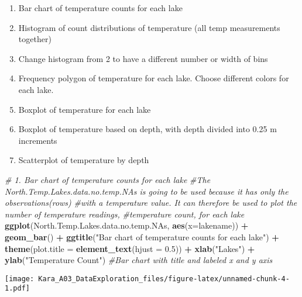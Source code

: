 \documentclass[]{article}
\newenvironment{Shaded}{\begin{snugshade}}{\end{snugshade}}
\newcommand{\KeywordTok}[1]{\textcolor[rgb]{0.13,0.29,0.53}{\textbf{#1}}}
\newcommand{\DataTypeTok}[1]{\textcolor[rgb]{0.13,0.29,0.53}{#1}}
\newcommand{\FloatTok}[1]{\textcolor[rgb]{0.00,0.00,0.81}{#1}}
\newcommand{\StringTok}[1]{\textcolor[rgb]{0.31,0.60,0.02}{#1}}
\newcommand{\CommentTok}[1]{\textcolor[rgb]{0.56,0.35,0.01}{\textit{#1}}}
\newcommand{\OperatorTok}[1]{\textcolor[rgb]{0.81,0.36,0.00}{\textbf{#1}}}
\newcommand{\NormalTok}[1]{#1}
\providecommand{\tightlist}{%
  \setlength{\itemsep}{0pt}\setlength{\parskip}{0pt}}
\begin{document}
\begin{enumerate}
\def\labelenumi{\arabic{enumi}.}
\tightlist
\item
  Bar chart of temperature counts for each lake
\item
  Histogram of count distributions of temperature (all temp measurements
  together)
\item
  Change histogram from 2 to have a different number or width of bins
\item
  Frequency polygon of temperature for each lake. Choose different
  colors for each lake.
\item
  Boxplot of temperature for each lake
\item
  Boxplot of temperature based on depth, with depth divided into 0.25 m
  increments
\item
  Scatterplot of temperature by depth
\end{enumerate}

\begin{Shaded}
\begin{Highlighting}[]
\CommentTok{# 1. Bar chart of temperature counts for each lake}
\CommentTok{#The North.Temp.Lakes.data.no.temp.NAs is going to be used because it has only the observations(rows) }
\CommentTok{#with a temperature value. It can therefore be used to plot the number of temperature readings, }
\CommentTok{#temperature count, for each lake}
\KeywordTok{ggplot}\NormalTok{(North.Temp.Lakes.data.no.temp.NAs, }\KeywordTok{aes}\NormalTok{(}\DataTypeTok{x=}\NormalTok{lakename)) }\OperatorTok{+}\StringTok{ }\KeywordTok{geom_bar}\NormalTok{() }\OperatorTok{+}\StringTok{ }
\StringTok{  }\KeywordTok{ggtitle}\NormalTok{(}\StringTok{"Bar chart of temperature counts for each lake"}\NormalTok{) }\OperatorTok{+}\StringTok{ }
\StringTok{  }\KeywordTok{theme}\NormalTok{(}\DataTypeTok{plot.title =} \KeywordTok{element_text}\NormalTok{(}\DataTypeTok{hjust =} \FloatTok{0.5}\NormalTok{)) }\OperatorTok{+}
\StringTok{  }\KeywordTok{xlab}\NormalTok{(}\StringTok{"Lakes"}\NormalTok{) }\OperatorTok{+}\StringTok{ }\KeywordTok{ylab}\NormalTok{(}\StringTok{"Temperature Count"}\NormalTok{) }\CommentTok{#Bar chart with title and labeled x and y axis}
\end{Highlighting}
\end{Shaded}

\texttt{[image: Kara\_A03\_DataExploration\_files/figure-latex/unnamed-chunk-4-1.pdf]}
\end{document}

